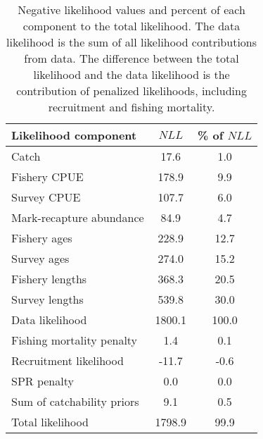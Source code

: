 \documentclass[
]{article}
\begin{document}
\begin{longtable}[t]{lcc}
\caption{\label{tab:likesum}Negative likelihood values and percent of each component to the total likelihood. The data likelihood is the sum of all likelihood contributions from data. The difference between the total likelihood and the data likelihood is the contribution of penalized likelihoods, including recruitment and fishing mortality.}\\
\toprule
Likelihood component & $NLL$ & \% of $NLL$\\
\midrule
Catch & 17.6 & 1.0\\
Fishery CPUE & 178.9 & 9.9\\
Survey CPUE & 107.7 & 6.0\\
Mark-recapture abundance & 84.9 & 4.7\\
Fishery ages & 228.9 & 12.7\\
\addlinespace
Survey ages & 274.0 & 15.2\\
Fishery lengths & 368.3 & 20.5\\
Survey lengths & 539.8 & 30.0\\
Data likelihood & 1800.1 & 100.0\\
Fishing mortality penalty & 1.4 & 0.1\\
\addlinespace
Recruitment likelihood & -11.7 & -0.6\\
SPR penalty & 0.0 & 0.0\\
Sum of catchability priors & 9.1 & 0.5\\
Total likelihood & 1798.9 & 99.9\\
\bottomrule
\end{longtable}
\end{document}
